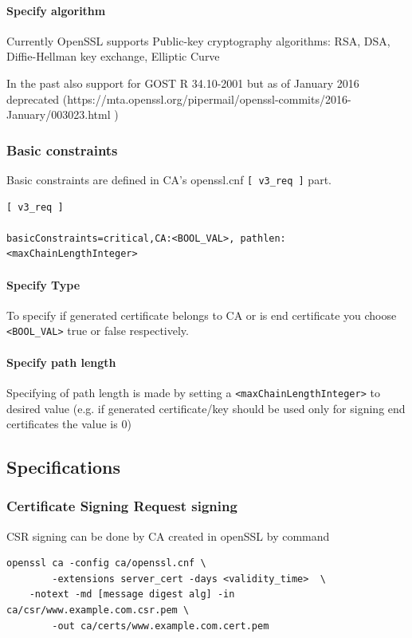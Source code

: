 \documentclass[10pt, a4paper]{report}
\begin{document}
      \paragraph{Specify algorithm}
      Currently OpenSSL supports Public-key cryptography algorithms:
      RSA, DSA, Diffie-Hellman key exchange, Elliptic Curve
      
      In the past also support for GOST R 34.10-2001 but as of January 2016 deprecated (https://mta.openssl.org/pipermail/openssl-commits/2016-January/003023.html )
      
      
    \subsubsection{Basic constraints}
    
    Basic constraints are defined in CA's openssl.cnf \verb+[ v3_req ]+ part.
    \begin{verbatim}
[ v3_req ]

basicConstraints=critical,CA:<BOOL_VAL>, pathlen:<maxChainLengthInteger>
    \end{verbatim}

      \paragraph{Specify Type}
To specify if generated certificate belongs to CA or is end certificate you choose \verb+<BOOL_VAL>+ true or false respectively.
      \paragraph{Specify path length}
Specifying of path length is made by setting a \verb+<maxChainLengthInteger>+ to desired value (e.g. if generated certificate/key should be used only for signing end certificates the value is 0)
  \subsection{Specifications}
  
    \subsubsection{Certificate Signing Request signing}
CSR signing can be done by CA created in openSSL by command
\begin{verbatim}
openssl ca -config ca/openssl.cnf \
        -extensions server_cert -days <validity_time>  \
	-notext -md [message digest alg] -in ca/csr/www.example.com.csr.pem \
        -out ca/certs/www.example.com.cert.pem
\end{verbatim}
\end{document}
